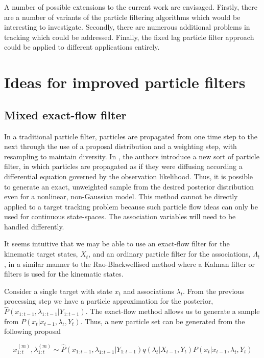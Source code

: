 A number of possible extensions to the current work are envisaged. Firstly, there are a number of variants of the particle filtering algorithms which would be interesting to investigate. Secondly, there are numerous additional problems in tracking which could be addressed. Finally, the fixed lag particle filter approach could be applied to different applications entirely.



\section{Ideas for improved particle filters}



\subsection{Mixed exact-flow filter}
In a traditional particle filter, particles are propagated from one time step to the next through the use of a proposal distribution and a weighting step, with resampling to maintain diversity. In \cite{Daum2010}, the authors introduce a new sort of particle filter, in which particles are propagated as if they were diffusing according a differential equation governed by the observation likelihood. Thus, it is possible to generate an exact, unweighted sample from the desired posterior distribution even for a nonlinear, non-Gaussian model. This method cannot be directly applied to a target tracking problem because such particle flow ideas can only be used for continuous state-spaces. The association variables will need to be handled differently.

It seems intuitive that we may be able to use an exact-flow filter for the kinematic target states, $X_t$, and an ordinary particle filter for the associations, $\Lambda_t$, in a similar manner to the Rao-Blackwellised method where a Kalman filter or filters is used for the kinematic states.

Consider a single target with state $x_t$ and associations $\lambda_t$. From the previous processing step we have a particle approximation for the posterior, $\hat{P}(x_{1:t-1}, \lambda_{1:t-1}|Y_{1:t-1})$. The exact-flow method allows us to generate a sample from $P(x_t|x_{t-1}, \lambda_t, Y_t)$. Thus, a new particle set can be generated from the following proposal

\begin{equation}
x_{1:t}^{(m)},\lambda_{1:t}^{(m)} \sim \hat{P}(x_{1:t-1}, \lambda_{1:t-1}|Y_{1:t-1}) q(\lambda_t|X_{t-1}, Y_t) P(x_t|x_{t-1}, \lambda_t, Y_t)
\end{equation}

